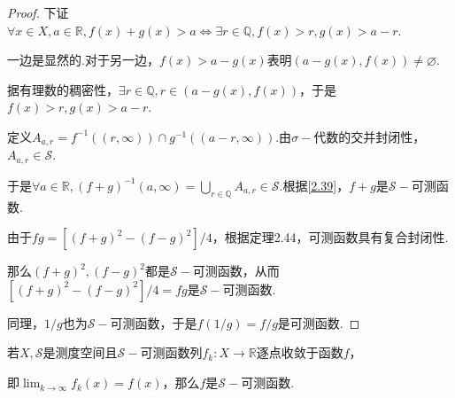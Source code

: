 \begin{proof}
    下证\(\forall x \in X, a \in \mathbb{R}, f(x)+g(x)>a \Longleftrightarrow \exists r \in \mathbb{Q}, f(x)>r, g(x)>a-r\).

    一边是显然的.对于另一边，\(f(x)>a-g(x)\)表明\((a-g(x),f(x)) \ne \varnothing\).

    据有理数的稠密性，\(\exists r \in \mathbb{Q}, r \in (a-g(x),f(x))\)，于是\(f(x)>r, g(x)>a-r\).

    定义\(A_{a,r}=f^{-1}((r,\infty)) \cap g^{-1}((a-r,\infty))\).由\(\sigma-\)代数的交并封闭性，\(A_{a,r} \in \mathcal{S}\).

    于是\(\forall a \in \mathbb{R}, (f+g)^{-1}(a,\infty)=\bigcup_{r \in \mathbb{Q}}A_{a,r} \in \mathcal{S}\).根据\cref{2.39}，\(f+g\)是\(\mathcal{S}-\)可测函数.

    由于\(fg=[(f+g)^2-(f-g)^2]/4\)，根据定理2.44，可测函数具有复合封闭性.
        
    那么\((f+g)^2, (f-g)^2\)都是\(\mathcal{S}-\)可测函数，从而\([(f+g)^2-(f-g)^2]/4=fg\)是\(\mathcal{S}-\)可测函数.

    同理，\(1/g\)也为\(\mathcal{S}-\)可测函数，于是\(f(1/g)=f/g\)是可测函数.
\end{proof}

\begin{theorem}[2.48]\label{2.48}
    若\(X,\mathcal{S}\)是测度空间且\(\mathcal{S}-\)可测函数列\(f_k:X \to \mathbb{R}\)逐点收敛于函数\(f\)，
    
    即\(\lim_{k \to \infty}f_k(x)=f(x)\)，那么\(f\)是\(\mathcal{S}-\)可测函数.
\end{theorem}

